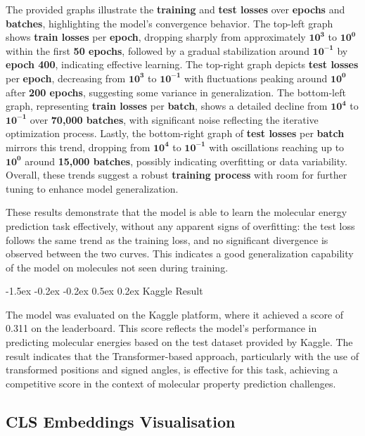 \documentclass{article}
\makeatletter
\newcounter{subsubsubsection}[subsubsection]
\newcommand\subsubsubsection{\@startsection{subsubsubsection}{4}{\z@}%
    {-1.5ex \@plus -0.2ex \@minus -0.2ex}%
    {0.5ex \@plus 0.2ex}%
    {\normalfont\normalsize\bfseries}}%
\makeatother
\begin{document}
The provided graphs illustrate the \textbf{training} and \textbf{test losses} over \textbf{epochs} and \textbf{batches}, highlighting the model's convergence behavior. The top-left graph shows \textbf{train losses} per \textbf{epoch}, dropping sharply from approximately \( \mathbf{10^3} \) to \( \mathbf{10^0} \) within the first \textbf{50 epochs}, followed by a gradual stabilization around \( \mathbf{10^{-1}} \) by \textbf{epoch 400}, indicating effective learning. The top-right graph depicts \textbf{test losses} per \textbf{epoch}, decreasing from \( \mathbf{10^3} \) to \( \mathbf{10^{-1}} \) with fluctuations peaking around \( \mathbf{10^0} \) after \textbf{200 epochs}, suggesting some variance in generalization. The bottom-left graph, representing \textbf{train losses} per \textbf{batch}, shows a detailed decline from \( \mathbf{10^4} \) to \( \mathbf{10^{-1}} \) over \textbf{70,000 batches}, with significant noise reflecting the iterative optimization process. Lastly, the bottom-right graph of \textbf{test losses} per \textbf{batch} mirrors this trend, dropping from \( \mathbf{10^4} \) to \( \mathbf{10^{-1}} \) with oscillations reaching up to \( \mathbf{10^0} \) around \textbf{15,000 batches}, possibly indicating overfitting or data variability. Overall, these trends suggest a robust \textbf{training process} with room for further tuning to enhance model generalization. \newline

These results demonstrate that the model is able to learn the molecular energy prediction task effectively, without any apparent signs of overfitting: the test loss follows the same trend as the training loss, and no significant divergence is observed between the two curves. This indicates a good generalization capability of the model on molecules not seen during training.

\subsubsubsection{Kaggle Result}

The model was evaluated on the Kaggle platform, where it achieved a score of 0.311 on the leaderboard. This score reflects the model's performance in predicting molecular energies based on the test dataset provided by Kaggle. The result indicates that the Transformer-based approach, particularly with the use of transformed positions and signed angles, is effective for this task, achieving a competitive score in the context of molecular property prediction challenges.



\subsection{CLS Embeddings Visualisation}
\end{document}
